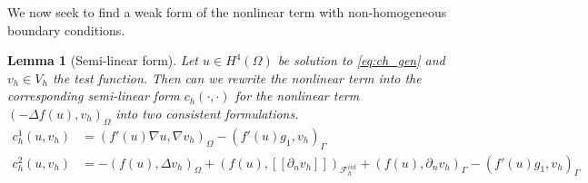 \documentclass[11pt]{article}
\newtheorem{lemma}[theorem]{Lemma}
\theoremstyle{remark}
\newtheorem*{remark}{Remark}
\newcommand{\jump}[1]{\left[\!\left[ #1 \right]\!\right]}
\numberwithin{equation}{section}
\begin{document}
We now seek to find a weak form of the nonlinear term with non-homogeneous boundary conditions.
\begin{lemma}[Semi-linear form]
    Let $u \in H^4( \Omega ) $ be solution to \eqref{eq:ch_gen} and $v_{h} \in V_{h}$ the test function.
Then can we rewrite the nonlinear term into the corresponding semi-linear form $c_{h}( \cdot ,\cdot )  $ for the nonlinear term $( -\Delta f( u) , v_{h})_{\Omega }$ into two consistent formulations.
\begin{align}
    \label{eq:ch:1}
      c^{1}_{h} ( u,v_{h})  & = ( f' ( u) \nabla u, \nabla v_{h} )_{\Omega }  - ( f'( u)  g_{1}   ,  v_{h})_{\Gamma } \\
    \label{eq:ch:2}
        c^{2}_{h} ( u,v_{h})  & = -( f( u), \Delta v_{h} )_{\Omega }+  ( f( u) , \jump{ \partial _{n}v_{h} }  )_{\mathcal{F} _{h}^{int}} + ( f(u), \partial _{n} v_{h})_{\Gamma  }  - ( f'( u)  g_{1}   ,  v_{h})_{\Gamma }
\end{align}

\end{lemma}
\end{document}
